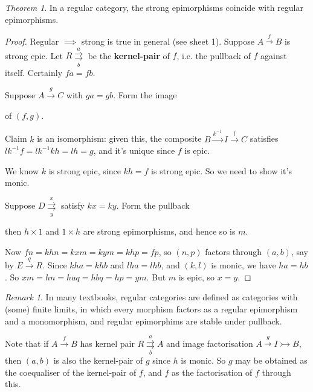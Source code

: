 \documentclass[a4paper]{article}
\theoremstyle{definition}
\theoremstyle{remark}
\newtheorem{remark}[definition]{Remark}
\theoremstyle{default}
\newtheorem{theorem}[definition]{Theorem}
\numberwithin{definition}{section}
\newcommand*\parallelpair[2]{\overset{#1}{\underset{#2}{\rightrightarrows}}}
\begin{document}
\begin{theorem}
	In a regular category, the strong epimorphisms coincide with regular epimorphisms.
\end{theorem}
\begin{proof}
	Regular $\implies$ strong is true in general (see sheet 1).
	Suppose $A \overset{f}{\rightarrowtriangle} B$ is strong epic.
	Let $R \parallelpair{a}{b}$ be the \textbf{kernel-pair} of $f$,
	i.e. the pullback of $f$ against itself. Certainly $fa = fb$.
	
	Suppose $A \overset{g}{\to} C$ with $ga = gb$. Form the image
	\begin{center}
	\end{center}
	of $(f, g)$.
	
	Claim $k$ is an isomorphism: given this,
	the composite $B \overset{k^{-1}}{\to} I \overset{l}{\to} C$ satisfies $lk^{-1}f = lk^{-1}kh = lh = g$,
	and it's unique since $f$ is epic.
	
	We know $k$ is strong epic, since $kh=f$ is strong epic.
	So we need to show it's monic.
	
	Suppose $D \parallelpair{x}{y}$ satisfy $kx=ky$. Form the pullback
	\begin{center}
	\end{center}
	then $h \times 1$ and $1 \times h$ are strong epimorphisms, and hence so is $m$.
	
	Now $fn = khn = kxm = kym = khp = fp$, 
	so $(n,p)$ factors through $(a, b)$,
	say by $E \overset{q}{\to} R$.
	Since $kha = khb$ and $lha = lhb$, and $(k, l)$ is monic, 
	we have $ha = hb$.
	So $xm = hn = haq = hbq = hp = ym$.
	But $m$ is epic, so $x=y$.
\end{proof}
\begin{remark}
	In many textbooks, regular categories are defined as categories with (some) finite limits,
	in which every morphism factors as a regular epimorphism and a monomorphism,
	and regular epimorphims are stable under pullback.
\end{remark}

Note that if $A \overset{f}{\to} B$ has kernel pair $R \parallelpair{a}{b} A$ and image factorisation
$A \overset{g}{\rightarrowtriangle} I \rightarrowtail B$,
then $(a, b)$ is also the kernel-pair of $g$ since $h$ is monic.
So $g$ may be obtained as the coequaliser of the kernel-pair of $f$,
and $f$ as the factorisation of $f$ through this.
\end{document}
